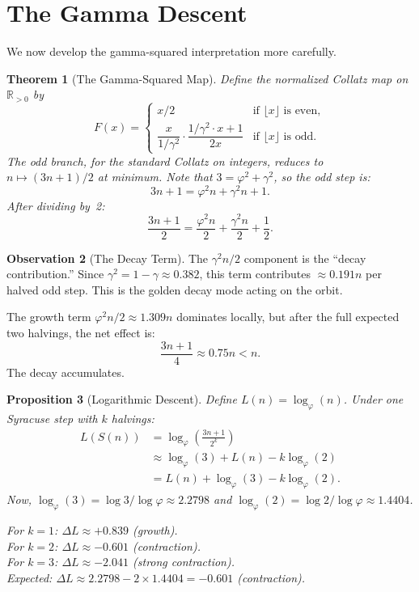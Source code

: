 \documentclass[11pt,a4paper]{article}
\newtheorem{theorem}{Theorem}[section]
\newtheorem{proposition}[theorem]{Proposition}
\theoremstyle{definition}
\newtheorem{observation}[theorem]{Observation}
\newcommand{\gam}{\gamma}
\newcommand{\RR}{\mathbb{R}}
\begin{document}
\section{The Gamma Descent}\label{sec:gamma-descent}

We now develop the gamma-squared interpretation more carefully.

\begin{theorem}[The Gamma-Squared Map]\label{thm:gamma-map}
Define the normalized Collatz map on $\RR_{>0}$ by
\[
  F(x) = \begin{cases}
    x/2 & \text{if } \lfloor x \rfloor \text{ is even}, \\[4pt]
    \dfrac{x}{1/\gam^2} \cdot \dfrac{1/\gam^2 \cdot x + 1}{2x} & \text{if }
    \lfloor x \rfloor \text{ is odd}.
  \end{cases}
\]
The odd branch, for the standard Collatz on integers, reduces to
$n \mapsto (3n+1)/2$ at minimum. Note that $3 = \varphi^2 + \gam^2$, so the
odd step is:
\[
  3n + 1 = \varphi^2 n + \gam^2 n + 1.
\]
After dividing by~2:
\[
  \frac{3n+1}{2} = \frac{\varphi^2 n}{2} + \frac{\gam^2 n}{2} + \frac{1}{2}.
\]
\end{theorem}

\begin{observation}[The Decay Term]
The $\gam^2 n / 2$ component is the ``decay contribution.'' Since
$\gam^2 = 1 - \gam \approx 0.382$, this term contributes $\approx 0.191n$
per halved odd step. This is the golden decay mode acting on the orbit.

The growth term $\varphi^2 n / 2 \approx 1.309n$ dominates locally, but after
the full expected two halvings, the net effect is:
\[
  \frac{3n+1}{4} \approx 0.75n < n.
\]
The decay accumulates.
\end{observation}

\begin{proposition}[Logarithmic Descent]\label{prop:log-descent}
Define $L(n) = \log_\varphi(n)$. Under one Syracuse step with $k$ halvings:
\begin{align}
  L(S(n)) &= \log_\varphi\!\left(\frac{3n+1}{2^k}\right) \nonumber \\
  &\approx \log_\varphi(3) + L(n) - k\log_\varphi(2) \nonumber \\
  &= L(n) + \log_\varphi(3) - k\log_\varphi(2). \label{eq:log-descent}
\end{align}
Now, $\log_\varphi(3) = \log 3 / \log\varphi \approx 2.2798$ and
$\log_\varphi(2) = \log 2 / \log\varphi \approx 1.4404$.

For $k = 1$: $\Delta L \approx +0.839$ (growth).\\
For $k = 2$: $\Delta L \approx -0.601$ (contraction).\\
For $k = 3$: $\Delta L \approx -2.041$ (strong contraction).\\
Expected: $\Delta L \approx 2.2798 - 2 \times 1.4404 = -0.601$ (contraction).
\end{proposition}
\end{document}
